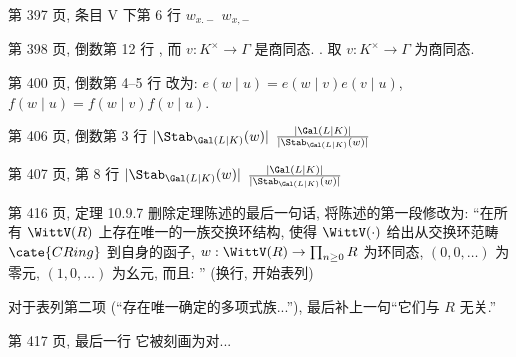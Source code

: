 \documentclass{AJerrata}
\begin{document}
\begin{Errata}

        \item[第 397 页, 条目 V 下第 6 行]
        \Orig $w_{x.-}$
        \Corr $w_{x,-}$

        \item[第 398 页, 倒数第 12 行]
        \Orig \; , 而 $v: K^\times \to \Gamma$ 是商同态.
        \Corr \; . 取 $v: K^\times \to \Gamma$ 为商同态.
        
        \item[第 400 页, 倒数第 4--5 行]
		改为: $e(w \mid u) = e(w \mid v) e(v \mid u)$, $f(w \mid u) = f(w \mid v) f(v \mid u)$.

		\item[第 406 页, 倒数第 3 行]
		\Orig $|\Stab_{\Gal(L|K)}(w)|$
		\Corr $\frac{|\Gal(L|K)|}{|\Stab_{\Gal(L|K)}(w)|}$
		
		\item[第 407 页, 第 8 行]
		\Orig $|\Stab_{\Gal(L|K)}(w)|$
		\Corr $\frac{|\Gal(L|K)|}{|\Stab_{\Gal(L|K)}(w)|}$

        \item[第 416 页, 定理 10.9.7]
		删除定理陈述的最后一句话, 将陈述的第一段修改为: ``在所有 $\WittV(R)$ 上存在唯一的一族交换环结构, 使得 $\WittV(\cdot)$ 给出从交换环范畴 $\cate{CRing}$ 到自身的函子, $w: \WittV(R) \to \prod_{n \geq 0} R$ 为环同态, $(0, 0, \ldots)$ 为零元, $(1, 0, \ldots)$ 为幺元, 而且: '' (换行, 开始表列)
        
        对于表列第二项 (``存在唯一确定的多项式族...''), 最后补上一句``它们与 $R$ 无关.''

        \item[第 417 页, 最后一行] 它被刻画为对...
	\end{Errata}
\end{document}
